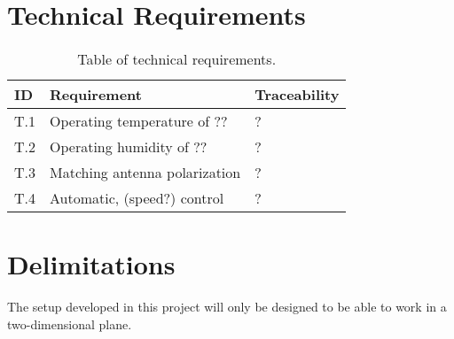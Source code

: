 \section{Technical Requirements}
\begin{table}[H]
    \centering
    \begin{tabular}{l|l|l} 
        \textbf{ID} & \textbf{Requirement} & \textbf{Traceability} \\
        \hline
        T.1 & Operating temperature of ?? & ? \\
        T.2 & Operating humidity of ?? & ? \\
        T.3 & Matching antenna polarization & ? \\
        T.4 & Automatic, (speed?) control & ? \\
    \end{tabular}
    \caption{Table of technical requirements.}
    \label{tab:tech_req}
\end{table}

\section{Delimitations}
The setup developed in this project will only be designed to be able to work in a two-dimensional plane. 